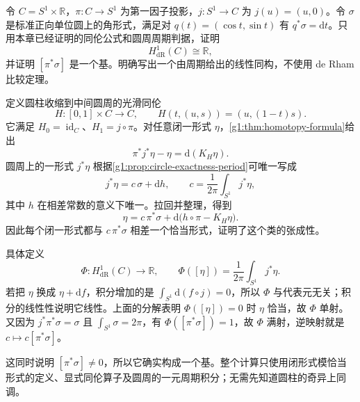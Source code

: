 \begin{exercise}\label{g1:ex:cylinder-first-de-rham}
	令 \(C=S^1\times\mathbb R\)，\(\pi:C\to S^1\) 为第一因子投影，\(j:S^1\to C\) 为 \(j(u)=(u,0)\)。令 \(\sigma\) 是标准正向单位圆上的角形式，满足对 \(q(t)=(\cos t,\sin t)\) 有 \(q^*\sigma=\mathrm{d}t\)。只用本章已经证明的同伦公式和圆周周期判据，证明
	\[
		H_{\mathrm{dR}}^1(C)\cong\mathbb R,
	\]
	并证明 \([\pi^*\sigma]\) 是一个基。明确写出一个由周期给出的线性同构，不使用 de Rham 比较定理。
\end{exercise}
\begin{solution}
	定义圆柱收缩到中间圆周的光滑同伦
	\[
		H:[0,1]\times C\longrightarrow C,\qquad H(t,(u,s))=(u,(1-t)s).
	\]
	它满足 \(H_0=\operatorname{id}_C\)、\(H_1=j\circ\pi\)。对任意闭一形式 \(\eta\)，\cref{g1:thm:homotopy-formula}给出
	\[
		\pi^*j^*\eta-\eta=\mathrm{d}(K_H\eta).
	\]
	圆周上的一形式 \(j^*\eta\) 根据\cref{g1:prop:circle-exactness-period}可唯一写成
	\[
		j^*\eta=c\,\sigma+\mathrm{d}h,\qquad
		c=\frac1{2\pi}\int_{S^1}j^*\eta,
	\]
	其中 \(h\) 在相差常数的意义下唯一。拉回并整理，得到
	\[
		\eta=c\,\pi^*\sigma+\mathrm{d}\bigl(h\circ\pi-K_H\eta\bigr).
	\]
	因此每个闭一形式都与 \(c\,\pi^*\sigma\) 相差一个恰当形式，证明了这个类的张成性。

	具体定义
	\[
		\Phi:H_{\mathrm{dR}}^1(C)\longrightarrow\mathbb R,\qquad
		\Phi([\eta])=\frac1{2\pi}\int_{S^1}j^*\eta.
	\]
	若把 \(\eta\) 换成 \(\eta+\mathrm{d}f\)，积分增加的是 \(\int_{S^1}\mathrm{d}(f\circ j)=0\)，所以 \(\Phi\) 与代表元无关；积分的线性性说明它线性。上面的分解表明 \(\Phi([\eta])=0\) 时 \(\eta\) 恰当，故 \(\Phi\) 单射。又因为 \(j^*\pi^*\sigma=\sigma\) 且 \(\int_{S^1}\sigma=2\pi\)，有 \(\Phi([\pi^*\sigma])=1\)，故 \(\Phi\) 满射，逆映射就是 \(c\mapsto c[\pi^*\sigma]\)。

	这同时说明 \([\pi^*\sigma]\ne0\)，所以它确实构成一个基。整个计算只使用闭形式模恰当形式的定义、显式同伦算子及圆周的一元周期积分；无需先知道圆柱的奇异上同调。
\end{solution}


